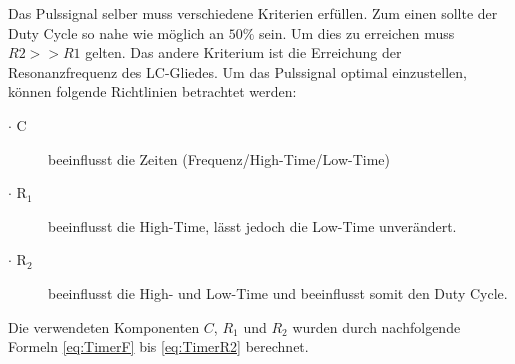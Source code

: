 Das Pulssignal selber muss verschiedene Kriterien erfüllen. Zum einen sollte der Duty Cycle so nahe wie möglich an $50\%$ sein. Um dies zu erreichen muss $R2 >> R1$ gelten. Das andere Kriterium ist die Erreichung der Resonanzfrequenz des LC-Gliedes. Um das Pulssignal optimal einzustellen, können folgende Richtlinien betrachtet werden:
\begin{description}
	\item [$\cdot$ C] beeinflusst die Zeiten (Frequenz/High-Time/Low-Time)
	\item [$\cdot$ R$_{1}$] beeinflusst die High-Time, lässt jedoch die Low-Time unverändert.
	\item [$\cdot$ R$_{2}$ ] beeinflusst die High- und Low-Time und beeinflusst somit den Duty Cycle.
\end{description}

Die verwendeten Komponenten $C$, $R_{1}$ und $R_{2}$ wurden durch nachfolgende Formeln \ref{eq:TimerF} bis \ref{eq:TimerR2} berechnet. 

